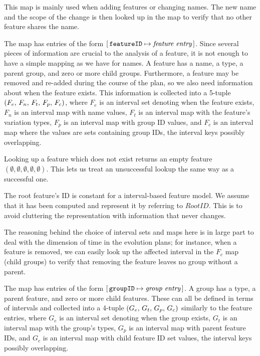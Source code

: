 This map is mainly used when adding features or changing names. The new name and the scope of the change is then looked up in the \names{} map to verify that no other feature shares the name.

The \features{} map has entries of the form $[ \,\texttt{featureID} \mapsto \textit{feature entry}\, ]$. Since several pieces of information are crucial to the analysis of a feature, it is not enough to have a simple mapping as we have for names.
A feature has a name, a type, a parent group, and zero or more child groups. Furthermore, a feature may be removed and re-added during the course of the plan, so we also need information about when the feature exists.
This information is collected into a 5-tuple $\left(F_e,\, F_n,\, F_t,\, F_p,\, F_c\right)$, where $F_e$ is an interval set denoting when the feature exists, $F_n$ is an interval map with name values, $F_t$ is an interval map with the feature's variation types, $F_p$ is an interval map with group ID values, and $F_c$ is an interval map where the values are sets containing group IDs, the interval keys possibly overlapping.

Looking up a feature which does not exist returns an empty feature $(\emptyset \comma \emptyset \comma \emptyset \comma \emptyset \comma \emptyset)$. This lets us treat an unsuccessful lookup the same way as a successful one.

The root feature's ID is constant for a interval-based feature model. We assume that it has been computed and represent it by referring to $RootID$. This is to avoid cluttering the representation with information that never changes.

The reasoning behind the choice of interval sets and maps here is in large part to deal with the dimension of time in the evolution plans; for instance, when a feature is removed, we can easily look up the affected interval in the $F_c$ map (child groups) to verify that removing the feature leaves no group without a parent.

The \groups{} map has entries of the form $[ \,\texttt{groupID} \mapsto \textit{group entry}\, ]$. A group has a type, a parent feature, and zero or more child features. These can all be defined in terms of intervals and collected into a 4-tuple $\left(G_e,\, G_t,\, G_p,\, G_c\right)$ similarly to the feature entries, where $G_e$ is an interval set denoting when the group exists, $G_t$ is an interval map with the group's types, $G_p$ is an interval map with parent feature IDs, and $G_c$ is an interval map with child feature ID set values, the interval keys possibly overlapping.

